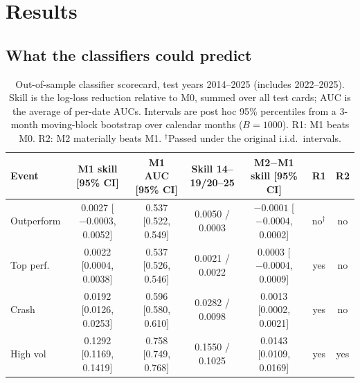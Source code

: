 \documentclass[11pt]{article}
\begin{document}
\section{Results}
\label{sec:results}

\subsection{What the classifiers could predict}

\begin{table}[t]
\centering\small
\setlength{\tabcolsep}{1.5pt}\footnotesize
\caption{Out-of-sample classifier scorecard, test years 2014--2025 (includes 2022--2025). Skill is the log-loss reduction relative to M0, summed over all test cards; AUC is the average of per-date AUCs. Intervals are post hoc 95\% percentiles from a 3-month moving-block bootstrap over calendar months ($B=1000$). R1: M1 beats M0. R2: M2 materially beats M1. $^\dagger$Passed under the original i.i.d.\ intervals.}
\label{tab:scorecard}
\begin{tabular}{@{}lcccccc@{}}
\toprule
Event & M1 skill [95\% CI] & M1 AUC [95\% CI] & Skill 14--19/20--25 & M2$-$M1 skill [95\% CI] & R1 & R2\\
\midrule
Outperform & 0.0027 [$-0.0003$, 0.0052] & 0.537 [0.522, 0.549] & 0.0050 / 0.0003 & $-0.0001$ [$-0.0004$, 0.0002] & no$^\dagger$ & no\\
Top perf. & 0.0022 [0.0004, 0.0038] & 0.537 [0.526, 0.546] & 0.0021 / 0.0022 & 0.0003 [$-0.0004$, 0.0009] & yes & no\\
Crash & 0.0192 [0.0126, 0.0253] & 0.596 [0.580, 0.610] & 0.0282 / 0.0098 & 0.0013 [0.0002, 0.0021] & yes & no\\
High vol & 0.1292 [0.1169, 0.1419] & 0.758 [0.749, 0.768] & 0.1550 / 0.1025 & 0.0143 [0.0109, 0.0169] & yes & yes\\
\bottomrule
\end{tabular}
\end{table}
\end{document}
